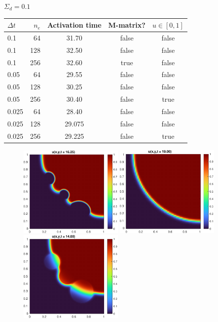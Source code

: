 \documentclass[unicode,11pt,a4paper,oneside,numbers=endperiod,openany]{article}
\begin{document}
$\Sigma_d = 0.1$
\begin{table}[H]
	\centering
	\begin{tabular}{l|r|ccc}
		$\Delta t$ & $n_e$ & Activation time & M-matrix? & $u \in [0, 1]$ \\
		\hline
		0.1        & 64    & 31.70           & false     & false          \\
		0.1        & 128   & 32.50           & false     & false          \\
		0.1        & 256   & 32.60           & true      & false          \\
		0.05       & 64    & 29.55           & false     & false          \\
		0.05       & 128   & 30.25           & false     & false          \\
		0.05       & 256   & 30.40           & false     & true           \\
		0.025      & 64    & 28.40           & false     & false          \\
		0.025      & 128   & 29.075          & false     & false          \\
		0.025      & 256   & 29.225          & false     & true           \\
	\end{tabular}
\end{table}


\begin{figure}[H]
	\centering
	\includegraphics[width=0.45\textwidth]{figs/S01.pdf}
	\includegraphics[width=0.45\textwidth]{figs/S1.pdf}
	\includegraphics[width=0.45\textwidth]{figs/S10.pdf}
\end{figure}

\nocite{*}


\end{document}
